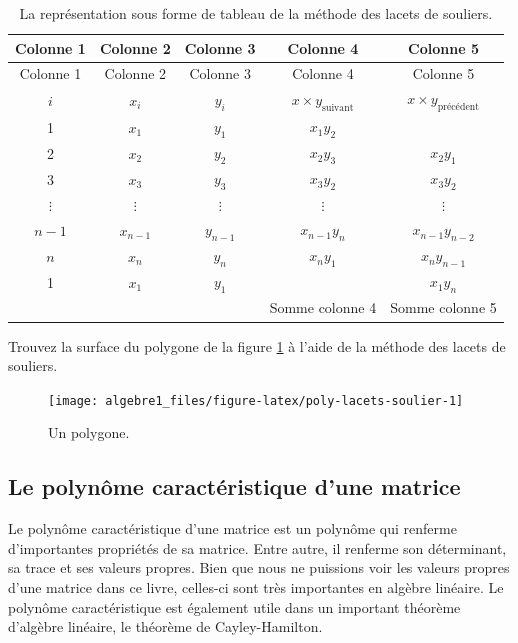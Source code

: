 \documentclass[]{book}
\theoremstyle{definition}
\theoremstyle{definition}
\theoremstyle{definition}
\theoremstyle{remark}
\let\BeginKnitrBlock\begin \let\EndKnitrBlock\end
\begin{document}
\begin{longtable}[]{@{}ccccc@{}}
\caption{\label{tab:lacet-soulier} La représentation sous forme de tableau de la méthode des lacets de souliers.}\tabularnewline
\toprule
Colonne 1 & Colonne 2 & Colonne 3 & Colonne 4 & Colonne 5\tabularnewline
\midrule
\endfirsthead
\toprule
Colonne 1 & Colonne 2 & Colonne 3 & Colonne 4 & Colonne 5\tabularnewline
\midrule
\endhead
\(i\) & \(x_i\) & \(y_i\) & \(x\times y_{\text{suivant}}\) & \(x\times y_{\text{précédent}}\)\tabularnewline
1 & \(x_1\) & \(y_1\) & \(x_1 y_2\) &\tabularnewline
2 & \(x_2\) & \(y_2\) & \(x_2 y_3\) & \(x_2 y_1\)\tabularnewline
3 & \(x_3\) & \(y_3\) & \(x_3 y_2\) & \(x_3 y_2\)\tabularnewline
\(\vdots\) & \(\vdots\) & \(\vdots\) & \(\vdots\) & \(\vdots\)\tabularnewline
\(n-1\) & \(x_{n-1}\) & \(y_{n-1}\) & \(x_{n-1} y_{n}\) & \(x_{n-1} y_{n-2}\)\tabularnewline
\(n\) & \(x_n\) & \(y_n\) & \(x_n y_1\) & \(x_n y_{n-1}\)\tabularnewline
1 & \(x_1\) & \(y_1\) & & \(x_1 y_n\)\tabularnewline
& & & Somme colonne 4 & Somme colonne 5\tabularnewline
\bottomrule
\end{longtable}

\BeginKnitrBlock{example}
\protect\hypertarget{exm:unnamed-chunk-121}{}{\label{exm:unnamed-chunk-121} }Trouvez la surface du polygone de la figure \ref{fig:poly-lacets-soulier} à l'aide de la méthode des lacets de souliers.
\EndKnitrBlock{example}

\begin{figure}

{\centering \texttt{[image: algebre1\_files/figure-latex/poly-lacets-soulier-1]} 

}

\caption{Un polygone.}\label{fig:poly-lacets-soulier}
\end{figure}

\hypertarget{le-polynuxf4me-caractuxe9ristique-dune-matrice}{%
\subsection{Le polynôme caractéristique d'une matrice}\label{le-polynuxf4me-caractuxe9ristique-dune-matrice}}

Le polynôme caractéristique d'une matrice est un polynôme qui renferme d'importantes propriétés de sa matrice. Entre autre, il renferme son déterminant, sa trace et ses valeurs propres. Bien que nous ne puissions voir les valeurs propres d'une matrice dans ce livre, celles-ci sont très importantes en algèbre linéaire. Le polynôme caractéristique est également utile dans un important théorème d'algèbre linéaire, le théorème de Cayley-Hamilton.
\end{document}
